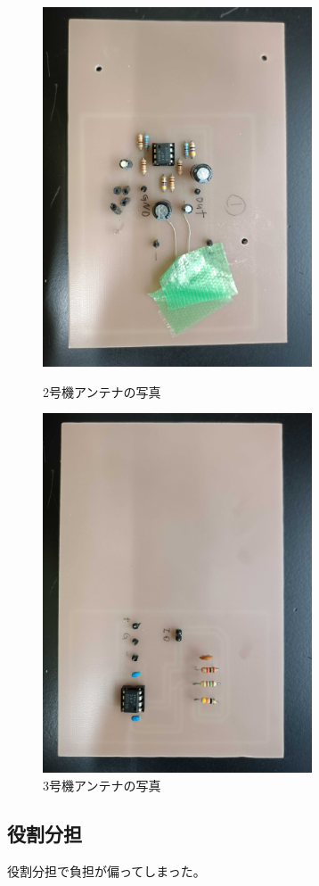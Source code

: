 \documentclass[report.tex]{subfiles}
\begin{document}
\begin{figure}[H]
	\begin{minipage}[b]{0.5\linewidth}
		\centering
		\includegraphics[width=8cm]{use/2.jpg}
		\caption{2号機アンテナの写真}
		\label{fig:s_6}
	\end{minipage}
	\begin{minipage}[b]{0.5\linewidth}
		\centering
		\includegraphics[width=8cm]{use/1.jpg}
		\caption{3号機アンテナの写真}
		\label{fig:s_7}
	\end{minipage}
\end{figure}

\subsection{役割分担}

役割分担で負担が偏ってしまった。
\end{document}
